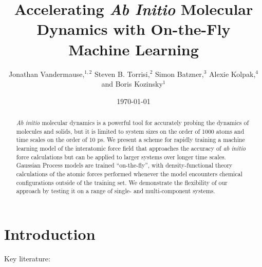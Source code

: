 \documentclass[%
reprint,
amsmath,amssymb,
aps,
]{revtex4-1}
\begin{document}
\title{Accelerating \textit{Ab Initio} Molecular Dynamics with On-the-Fly
Machine Learning}

\author{Jonathan Vandermause,$^{1,2}$ Steven B. Torrisi,$^{2}$
    Simon Batzner,$^{3}$ Alexie Kolpak,$^{4}$ and Boris Kozinsky$^{1}$}

\date{\today}

\begin{abstract}
\textit{Ab initio} molecular dynamics is a powerful tool for
accurately probing the dynamics of molecules and solids, but it is limited
to system sizes on the order of 1000 atoms and time scales on the order of
10 ps. We present a scheme for rapidly training a machine learning 
model of the interatomic force field that approaches the accuracy of \textit{ab initio} force calculations but can be applied to larger systems over longer time scales. Gaussian Process models are trained “on-the-fly”, with density-functional theory calculations of the atomic forces performed whenever the model encounters chemical configurations outside of the training set. We demonstrate the flexibility of our approach by testing it on a range of single- and multi-component systems.
\end{abstract}

\maketitle

\section{\label{sec:level1}Introduction}
\noindent
Key literature:
\end{document}
